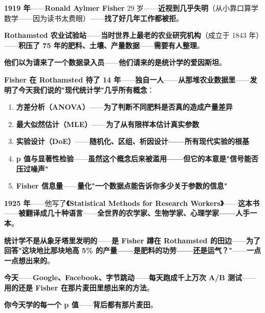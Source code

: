 \begin{tcolorbox}[storybox={\Large 小故事：R.A. Fisher 与 Rothamsted 农场}]
\textbf{1919 年}——\textbf{Ronald Aylmer Fisher} 29 岁——\textbf{近视到几乎失明}（从小靠口算学数学——因为读书太费眼）——\textbf{找了好几年工作都被拒}。

\medskip

\textbf{Rothamsted 农业试验站}——\textbf{当时世界上最老的农业研究机构}（成立于 1843 年）——\textbf{积压了 75 年的肥料、土壤、产量数据}——\textbf{需要有人整理}。

\medskip

\textbf{他们以为请来了一个数据录入员}——\textbf{他们请来的是统计学的爱因斯坦}。

\medskip

\textbf{Fisher 在 Rothamsted 待了 14 年}——\textbf{独自一人}——\textbf{从那堆农业数据里}——\textbf{发明了今天我们说的"现代统计学"几乎所有概念}：

\begin{enumerate}
\item \textbf{方差分析（ANOVA）}——\textbf{为了判断不同肥料是否真的造成产量差异}
\item \textbf{最大似然估计（MLE）}——\textbf{为了从有限样本估计真实参数}
\item \textbf{实验设计（DoE）}——\textbf{随机化、区组、析因设计——所有现代实验的根基}
\item \textbf{p 值与显著性检验}——\textbf{虽然这个概念后来被滥用——但它的本意是"信号能否压过噪声"}
\item \textbf{Fisher 信息量}——\textbf{量化"一个数据点能告诉你多少关于参数的信息"}
\end{enumerate}

\medskip

\textbf{1925 年}——他写了\textbf{《Statistical Methods for Research Workers》}——\textbf{这本书}——\textbf{被翻译成几十种语言}——\textbf{全世界的农学家、生物学家、心理学家——人手一本}。

\medskip

\textbf{统计学不是从象牙塔里发明的}——\textbf{是 Fisher 蹲在 Rothamsted 的田边}——\textbf{为了回答"这块地比那块地高 5\% 的产量——是肥料的功劳——还是运气？"}——\textbf{一点一点想出来的}。

\medskip

\textbf{今天}——\textbf{Google、Facebook、字节跳动}——\textbf{每天跑成千上万次 A/B 测试}——\textbf{用的还是 Fisher 在那片麦田里想出来的方法}。

\medskip

\textbf{你今天学的每一个 p 值}——\textbf{背后都有那片麦田}。
\end{tcolorbox}

